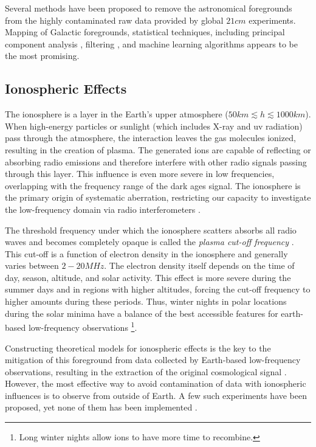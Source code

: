\documentclass[12pt, TexShade, letterpaper]{report}
\begin{document}
Several methods have been proposed to remove the astronomical foregrounds from the highly contaminated raw data provided by global $21cm$ experiments. Mapping of Galactic foregrounds, statistical techniques, including principal component analysis \cite{principal_component}, filtering \cite{filtering}, and machine learning algorithms \cite{removal_deep_learning, signal_reconstruction, signal_extraction, extract_foreground, pritchard_mcmc} appears to be the most promising\cite{thesis_pamela}.\par

\subsection{Ionospheric Effects}
The ionosphere is a layer in the Earth's upper atmosphere ($50km \lesssim h \lesssim 1000 km$). When high-energy particles or sunlight (which includes X-ray and \gls{uv} radiation) pass through the atmosphere, the interaction leaves the gas molecules ionized, resulting in the creation of plasma. The generated ions are capable of reflecting or absorbing radio emissions and therefore interfere with other radio signals passing through this layer. This influence is even more severe in low frequencies, overlapping with the frequency range of the dark ages signal. The ionosphere is the primary origin of systematic aberration, restricting our capacity to investigate the low-frequency domain via radio interferometers \cite{thesis_pamela, ionosphere_ultra_low}.\par
The threshold frequency under which the ionosphere scatters absorbs all radio waves and becomes completely opaque is called the \emph{plasma cut-off frequency} \cite{ionosphere_effect_book, thesis_pamela}. This cut-off is a function of electron density in the ionosphere and generally varies between $2-20MHz$. The electron density itself depends on the time of day, season, altitude, and solar activity. This effect is more severe during the summer days and in regions with higher altitudes, forcing the cut-off frequency to higher amounts during these periods. Thus, winter nights in polar locations during the solar minima have a balance of the best accessible features for earth-based low-frequency observations  \cite{thesis_pamela} \footnote{Long winter nights allow ions to have more time to recombine.}.\par
Constructing theoretical models for ionospheric effects is the key to the mitigation of this foreground from data collected by Earth-based low-frequency observations, resulting in the extraction of the original cosmological signal \cite{ionosphere_model, ionosphere_Bayesian}. However, the most effective way to avoid contamination of data with ionospheric influences is to observe from outside of Earth\cite{thesis_shedding}. A few such experiments have been proposed, yet none of them has been implemented \cite{dare_1, dare_2, 21cm_space_interferometer, lunar_orbit_21cm}. \par
\end{document}
